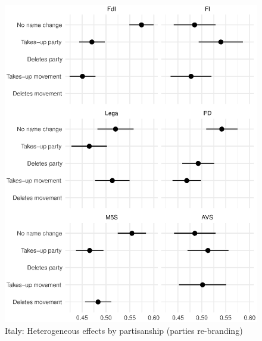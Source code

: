 \documentclass[12pt]{article}
\begin{document}
\begin{figure}[H]
\includegraphics[width=\textwidth]{./Figures/CJ2_by_party_tradeoff_Italy.eps}
\caption{Italy: Heterogeneous effects by partisanship (parties re-branding)}
\end{figure}
\end{document}
